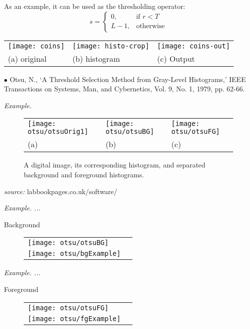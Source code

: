 \documentclass{response}
\begin{document}
{\large 
As an example, it can be used as the thresholding operator:
\[
    s= 
\begin{cases}
    0, & \text{if } r < T\\
    L-1, & \text{otherwise}
\end{cases}
\]
\renewcommand{\tabcolsep}{0.2em}
\begin{tabular}{lll}
\texttt{[image: coins]} & \texttt{[image: histo-crop]} &
\texttt{[image: coins-out]} \\
(a) original & (b) histogram & (c) Output
\end{tabular}

\vfill

{\small
$\bullet$ Otsu, N., `A Threshold Selection Method from Gray-Level Histograms,' IEEE Transactions on Systems, Man, and Cybernetics, Vol. 9, No. 1, 1979, pp. 62-66.  
}

\newpage

\textit{Example.}


\begin{figure}[hbp]
\centering
\begin{tabular}{lll}
\texttt{[image: otsu/otsuOrig1]} &  \texttt{[image: otsu/otsuBG]} & \texttt{[image: otsu/otsuFG]}\\
(a) & (b) & (c)
\end{tabular}
\caption{A digital image, its corresponding histogram, and separated background and foreground histograms.}
\end{figure}


\vfill
{\small \textit{source:} labbookpages.co.uk/software/}



\newpage
\textit{Example. ...}

{\huge Background}

\begin{figure}[hbp]
\centering
\begin{tabular}{ll}
\hspace*{10.5cm}\texttt{[image: otsu/otsuBG]}\\
\texttt{[image: otsu/bgExample]}
\end{tabular}
\end{figure}


\newpage
\textit{Example. ...}

{\huge Foreground}

\begin{figure}[hpb]
\centering
\begin{tabular}{ll}
\hspace*{10.5cm}\texttt{[image: otsu/otsuFG]}\\
\texttt{[image: otsu/fgExample]}
\end{tabular}
\end{figure}


}
\end{document}
